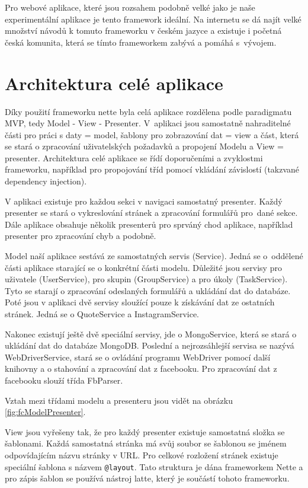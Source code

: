 \documentclass[thesis=M,czech]{FITthesis}[2013/05/10]
\begin{document}
Pro webové aplikace, které jsou rozsahem podobně velké jako je naše experimentální aplikace je tento framework ideální. Na internetu se dá najít velké množství návodů k tomuto frameworku v českém jazyce a existuje i početná česká komunita, která se tímto frameworkem zabývá a pomáhá s~vývojem. 


\section{Architektura celé aplikace}

Díky použití frameworku nette byla celá aplikace rozdělena podle paradigmatu MVP, tedy Model - View - Presenter. V~aplikaci jsou samostatně nahraditelné části pro práci s daty = model, šablony pro zobrazování dat = view a část, která se stará o zpracování uživatelských požadavků a propojení Modelu a View = presenter. Architektura celé aplikace se řídí doporučeními a zvyklostmi frameworku, například pro propojování tříd pomocí vkládání závislostí (takzvané dependency injection).

V aplikaci existuje pro každou sekci v navigaci samostatný presenter. Každý presenter se stará o vykreslování stránek  a zpracování formulářů pro~dané sekce. Dále aplikace obsahuje několik presenterů pro sprváný chod aplikace, například presenter pro zpracování chyb a podobně.

Model naší aplikace sestává ze samostatných servis (Service). Jedná se o~oddělené části aplikace starající se o konkrétní části modelu. Důležité jsou servisy pro uživatele (UserService), pro skupin (GroupService) a pro úkoly (TaskService). Tyto se starají o zpracování odeslaných formulářů a ukládání dat do databáze. Poté jsou v aplikaci dvě servisy sloužící pouze k získávání dat ze ostatních stránek. Jedná se o QuoteService a InstagramService. 

Nakonec existují ještě dvě speciální servisy, jde o MongoService, která se stará o ukládání dat do databáze MongoDB. Poslední a nejrozsáhlejší servisa se nazývá WebDriverService, stará se o ovládání programu WebDriver pomocí další knihovny a o stahování a zpracování dat z facebooku. Pro zpracování dat z facebooku slouží třída FbParser.

Vztah mezi třídami modelu a presenteru jsou vidět na obrázku \ref{fig:fcModelPresenter}.

View jsou vyřešeny tak, že pro každý presenter existuje samostatná složka se šablonami. Každá samostatná stránka má svůj soubor se šablonou se jménem odpovídajícím názvu stránky v URL. Pro celkové rozložení stránek existuje speciální šablona s názvem \verb|@layout|. Tato struktura je dána frameworkem Nette a pro zápis šablon se používá nástroj latte, který je součástí tohoto frameworku. 
\end{document}
